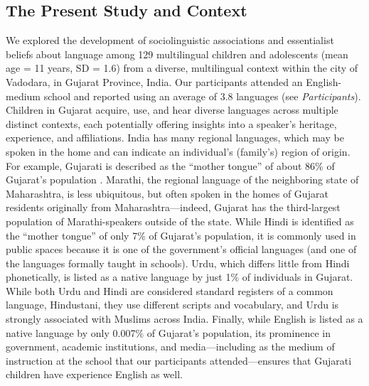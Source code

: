 \documentclass{foushee-adapted-preprint}
\begin{document}
\subsection*{The Present Study and Context}
We explored the development of sociolinguistic associations and essentialist beliefs about language among 129 multilingual children and adolescents (mean age = 11 years, SD = 1.6) from a diverse, multilingual context within the city of Vadodara, in Gujarat Province, India. 
Our participants attended an English-medium school and reported using an average of 3.8 languages (see \textit{Participants}). 
Children in Gujarat acquire, use, and hear diverse languages across multiple distinct contexts, each potentially offering insights into a speaker's heritage, experience, and affiliations. 
India has many regional languages, which may be spoken in the home and can indicate an individual's (family's) region of origin. 
For example, Gujarati is described as the ``mother tongue'' of about 86\% of Gujarat's population \parencite{india2011census}. 
Marathi, the regional language of the neighboring state of Maharashtra, is less ubiquitous, but often spoken in the homes of Gujarat residents originally from Maharashtra---indeed, Gujarat has the third-largest population of Marathi-speakers outside of the state. 
While Hindi is identified as the ``mother tongue'' of only 7\% of Gujarat's population, it is commonly used in public spaces because it is one of the government's official languages (and one of the languages formally taught in schools). 
Urdu, which differs little from Hindi phonetically, is listed as a native language by just 1\% of individuals in Gujarat. While both Urdu and Hindi are considered standard registers of a common language, Hindustani, they use different scripts and vocabulary, and Urdu is strongly associated with Muslims across India.  
Finally, while English is listed as a native language by only 0.007\% of Gujarat's population, its prominence in government, academic institutions, and media---including as the medium of instruction at the school that our participants attended---ensures that Gujarati children have experience English as well. 
\end{document}

